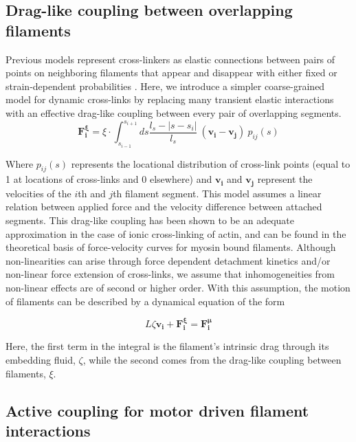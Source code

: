 \documentclass[10pt,letterpaper]{article}
\begin{document}
\subsection*{Drag-like coupling between overlapping filaments}
\label{exp_drag}
Previous models represent cross-linkers as elastic connections between pairs of points on neighboring filaments that appear and disappear with either fixed or strain-dependent probabilities \cite{model_taeyoon,theo_crosslinknonlinear}.  Here, we introduce a simpler coarse-grained model for dynamic cross-links by replacing many transient elastic interactions with an effective drag-like coupling between every pair of overlapping segments.
\begin{equation}
\label{eqn:drag}
\mathbf{F^{\xi}_i} = \xi \cdot \int^{s_{i+1}}_{s_{i-1}} ds \frac{l_s-|s-s_i|}{l_s} \: (\mathbf{v_i}-\mathbf{v_j}) \: p_{ij}(s)
\end{equation}

Where $p_{ij}(s)$ represents the locational distribution of cross-link points (equal to 1 at locations of cross-links and 0 elsewhere) and $\mathbf{v_i}$ and $\mathbf{v_j}$ represent the velocities of the $i$th and $j$th filament segment.  This model assumes a linear relation between applied force and the velocity difference between attached segments.  This drag-like coupling has been shown to be an adequate approximation in the case of ionic cross-linking of actin\cite{mol_fric,theo_hydroish2}, and can be found in the theoretical basis of force-velocity curves for myosin bound filaments\cite{theo_frictionShila}. Although non-linearities can arise through force dependent detachment kinetics and/or non-linear force extension of cross-links, we assume that inhomogeneities from non-linear effects are of second or higher order. With this assumption, the motion of filaments can be described by a dynamical equation of the form

\begin{equation}
\label{eqn:syst1}
L\zeta\mathbf{ v_i} +\mathbf{F^{\xi}_i}= \mathbf{F^{\mu}_i}
\end{equation}

Here, the first term in the integral is the filament's intrinsic drag through its embedding fluid, $\zeta$, while the second comes from the drag-like coupling between filaments, $\xi$.  

\subsection*{Active coupling for motor driven filament interactions}
\end{document}
